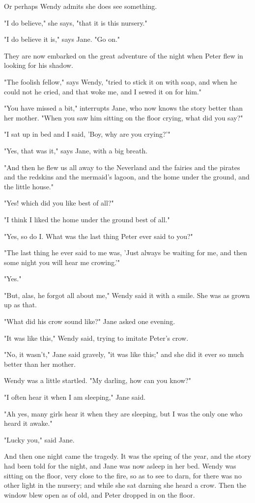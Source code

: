 Or perhaps Wendy admits she does see something.


"I do believe," she says, "that it is this nursery."


"I do believe it is," says Jane. "Go on."


They are now embarked on the great adventure of the night when Peter flew
in looking for his shadow.


"The foolish fellow," says Wendy, "tried to stick it on with soap, and
when he could not he cried, and that woke me, and I sewed it on for him."


"You have missed a bit," interrupts Jane, who now knows the story better
than her mother. "When you saw him sitting on the floor crying, what did
you say?"


"I sat up in bed and I said, 'Boy, why are you crying?'"


"Yes, that was it," says Jane, with a big breath.


"And then he flew us all away to the Neverland and the fairies and the
pirates and the redskins and the mermaid's lagoon, and the home under the
ground, and the little house."


"Yes! which did you like best of all?"


"I think I liked the home under the ground best of all."


"Yes, so do I. What was the last thing Peter ever said to you?"


"The last thing he ever said to me was, 'Just always be waiting for me,
and then some night you will hear me crowing.'"


"Yes."


"But, alas, he forgot all about me," Wendy said it with a smile. She was
as grown up as that.


"What did his crow sound like?" Jane asked one evening.


"It was like this," Wendy said, trying to imitate Peter's crow.


"No, it wasn't," Jane said gravely, "it was like this;" and she did it
ever so much better than her mother.


Wendy was a little startled. "My darling, how can you know?"


"I often hear it when I am sleeping," Jane said.


"Ah yes, many girls hear it when they are sleeping, but I was the only one
who heard it awake."


"Lucky you," said Jane.


And then one night came the tragedy. It was the spring of the year, and
the story had been told for the night, and Jane was now asleep in her bed.
Wendy was sitting on the floor, very close to the fire, so as to see to
darn, for there was no other light in the nursery; and while she sat
darning she heard a crow. Then the window blew open as of old, and Peter
dropped in on the floor.


